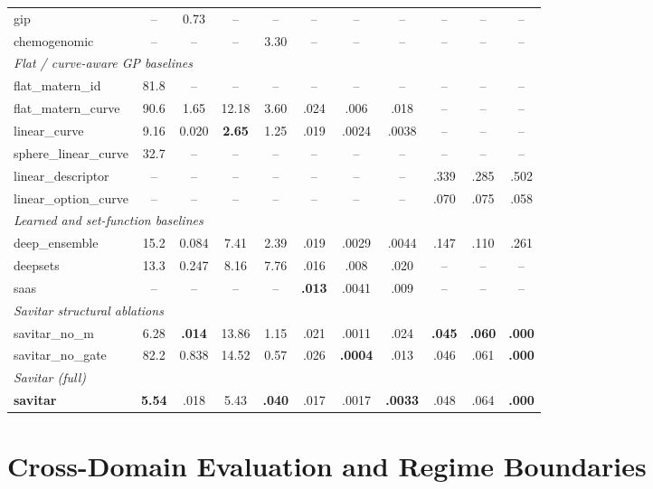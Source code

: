 \documentclass{article}
\begin{document}
\begin{table}[t]
\begin{tabular}{l cccc ccc ccc}
gip & -- & 0.73 & -- & -- & -- & -- & -- & -- & -- & -- \\
chemogenomic & -- & -- & -- & 3.30 & -- & -- & -- & -- & -- & -- \\
\multicolumn{11}{l}{\emph{Flat / curve-aware GP baselines}}\\
flat\_matern\_id & 81.8 & -- & -- & -- & -- & -- & -- & -- & -- & -- \\
flat\_matern\_curve & 90.6 & 1.65 & 12.18 & 3.60 & .024 & .006 & .018 & -- & -- & -- \\
linear\_curve & 9.16 & 0.020 & \textbf{2.65} & 1.25 & .019 & .0024 & .0038 & -- & -- & -- \\
sphere\_linear\_curve & 32.7 & -- & -- & -- & -- & -- & -- & -- & -- & -- \\
linear\_descriptor & -- & -- & -- & -- & -- & -- & -- & .339 & .285 & .502 \\
linear\_option\_curve & -- & -- & -- & -- & -- & -- & -- & .070 & .075 & .058 \\
\multicolumn{11}{l}{\emph{Learned and set-function baselines}}\\
deep\_ensemble & 15.2 & 0.084 & 7.41 & 2.39 & .019 & .0029 & .0044 & .147 & .110 & .261 \\
deepsets & 13.3 & 0.247 & 8.16 & 7.76 & .016 & .008 & .020 & -- & -- & -- \\
saas & -- & -- & -- & -- & \textbf{.013} & .0041 & .009 & -- & -- & -- \\
\multicolumn{11}{l}{\emph{Savitar structural ablations}}\\
savitar\_no\_m & 6.28 & \textbf{.014} & 13.86 & 1.15 & .021 & .0011 & .024 & \textbf{.045} & \textbf{.060} & \textbf{.000} \\
savitar\_no\_gate & 82.2 & 0.838 & 14.52 & 0.57 & .026 & \textbf{.0004} & .013 & .046 & .061 & \textbf{.000} \\
\multicolumn{11}{l}{\emph{Savitar (full)}}\\
\textbf{savitar} & \textbf{5.54} & .018 & 5.43 & \textbf{.040} & .017 & .0017 & \textbf{.0033} & .048 & .064 & \textbf{.000} \\
\bottomrule
\end{tabular}
\vskip -0.1in
\end{table}

\section{Cross-Domain Evaluation and Regime Boundaries}
\label{sec:experiments}
\label{sec:regimes}
\end{document}
